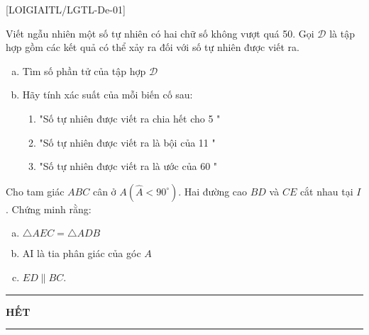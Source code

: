 
%
%

[LOIGIAITL/LGTL-De-01]
{}
\begin{bt}
      	Viết ngẫu nhiên một số tự nhiên có hai chữ số không vượt quá 50. Gọi $\mathscr{D}$ là tập hợp gồm các kết quả có thể xảy ra đối với số tự nhiên được viết ra.
      	\begin{enumerate}[a)]
      		\item Tìm số phần tử của tập hợp $\mathscr{D}$
      		\item Hãy tính xác suất của mỗi biến cố sau:
      		    \begin{enumerate}[b1)]
      			\item "Số tự nhiên được viết ra chia hết cho 5 "
      			
      			\item "Số tự nhiên được viết ra là bội của 11 "
      			
      			\item "Số tự nhiên được viết ra là ước của 60 "	 
      			\end{enumerate}
      	\end{enumerate}
	\loigiai{}
\end{bt}
\begin{bt}
	 Cho tam giác $ABC$ cân ở $A\left(\hat{A} < 90^{\circ}\right)$. Hai đường cao $BD$ và $CE$ cắt nhau tại $I$. Chứng minh rằng:
	   \begin{enumerate}[a)]
	      		\item $\triangle AEC=\triangle ADB$
	      		\item AI là tia phân giác của góc $A$
	      		\item $ED \parallel BC$.
	   \end{enumerate}
	\loigiai{}
\end{bt}


\fileend

\begin{center}
	\rule[4pt]{2cm}{1pt}\large \textbf{HẾT}\rule[4pt]{2cm}{1pt}
\end{center}











